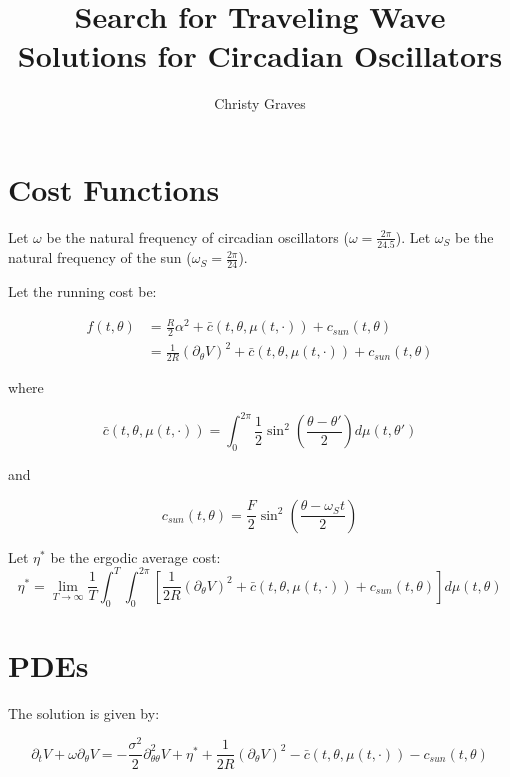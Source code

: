 \documentclass[]{article}
\title{}
\author{}
\title{Search for Traveling Wave Solutions for Circadian Oscillators}
\author{Christy Graves}
\begin{document}
\maketitle

\section{Cost Functions}
Let $\omega$ be the natural frequency of circadian oscillators ($\omega=\frac{2\pi}{24.5}$). Let $\omega_S$ be the natural frequency of the sun ($\omega_S=\frac{2\pi}{24}$).

Let the running cost be:

\begin{equation}
\begin{split}
f(t,\theta)&=\frac{R}{2}\alpha^2+\bar{c}(t,\theta,\mu(t,\cdot))+c_{sun}(t,\theta) \\
&=\frac{1}{2R}(\partial_\theta V)^2+\bar{c}(t,\theta,\mu(t,\cdot))+c_{sun}(t,\theta)
\end{split}
\end{equation}

where

\begin{equation}
\bar{c}(t,\theta,\mu(t,\cdot))=\int_0^{2\pi}\frac{1}{2} \sin^2\left(\frac{\theta-\theta'}{2}\right)d \mu(t,\theta')
\end{equation}

and

\begin{equation}
c_{sun}(t,\theta)=\frac{F}{2} \sin^2\left(\frac{\theta-\omega_St}{2}\right)
\end{equation}

Let $\eta^*$ be the ergodic average cost:
\begin{equation}
\eta^*=\lim_{T \rightarrow \infty} \frac{1}{T} \int_0^T \int_0^{2\pi} \left[\frac{1}{2R}(\partial_\theta V)^2+\bar{c}(t,\theta,\mu(t,\cdot))+c_{sun}(t,\theta) \right] d\mu(t,\theta)
\end{equation}

\section{PDEs}
The solution is given by:

\begin{equation}
\partial_t V+\omega \partial_\theta V=-\frac{\sigma^2}{2}\partial_{\theta \theta}^2 V+\eta^*+\frac{1}{2R}(\partial_\theta V)^2-\bar{c}(t,\theta,\mu(t,\cdot))-c_{sun}(t,\theta)
\label{HJB}
\end{equation}
\end{document}
